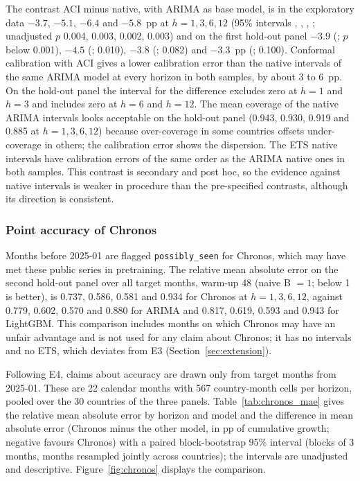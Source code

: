 The contrast ACI minus native, with ARIMA as base model, is in the exploratory data $-3.7$, $-5.1$, $-6.4$ and $-5.8$~pp at $h=1,3,6,12$ (95\% intervals , , , ; unadjusted $p$ 0.004, 0.003, 0.002, 0.003) and on the first hold-out panel $-3.9$ (; $p$ below 0.001), $-4.5$ (; 0.010), $-3.8$ (; 0.082) and $-3.3$~pp (; 0.100). Conformal calibration with ACI gives a lower calibration error than the native intervals of the same ARIMA model at every horizon in both samples, by about 3 to 6~pp. On the hold-out panel the interval for the difference excludes zero at $h=1$ and $h=3$ and includes zero at $h=6$ and $h=12$. The mean coverage of the native ARIMA intervals looks acceptable on the hold-out panel (0.943, 0.930, 0.919 and 0.885 at $h=1,3,6,12$) because over-coverage in some countries offsets under-coverage in others; the calibration error shows the dispersion. The ETS native intervals have calibration errors of the same order as the ARIMA native ones in both samples. This contrast is secondary and post hoc, so the evidence against native intervals is weaker in procedure than the pre-specified contrasts, although its direction is consistent.

\subsubsection{Point accuracy of Chronos}\label{sec:chronos}

Months before 2025-01 are flagged \texttt{possibly\_seen} for Chronos, which may have met these public series in pretraining. The relative mean absolute error on the second hold-out panel over all target months, warm-up 48 (naive B $=1$; below 1 is better), is 0.737, 0.586, 0.581 and 0.934 for Chronos at $h=1,3,6,12$, against 0.779, 0.602, 0.570 and 0.880 for ARIMA and 0.817, 0.619, 0.593 and 0.943 for LightGBM. This comparison includes months on which Chronos may have an unfair advantage and is not used for any claim about Chronos; it has no intervals and no ETS, which deviates from E3 (Section~\ref{sec:extension}).

Following E4, claims about accuracy are drawn only from target months from 2025-01. These are 22 calendar months with 567 country-month cells per horizon, pooled over the 30 countries of the three panels. Table~\ref{tab:chronos_mae} gives the relative mean absolute error by horizon and model and the difference in mean absolute error (Chronos minus the other model, in pp of cumulative growth; negative favours Chronos) with a paired block-bootstrap 95\% interval (blocks of 3 months, months resampled jointly across countries); the intervals are unadjusted and descriptive. Figure~\ref{fig:chronos} displays the comparison.

